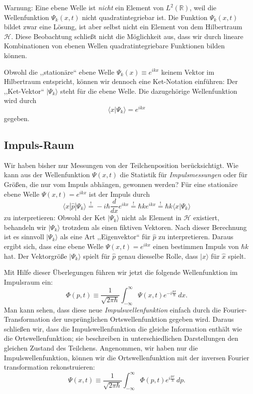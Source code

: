 Warnung: Eine ebene Welle ist \emph{nicht} ein Element von $L^2(\mathbb{R})$, weil die Wellenfunktion $\Psi_{k}(x,t)$ nicht quadratintegriebar ist. Die Funktion $\Psi_{k}(x,t)$ bildet zwar eine Lösung, ist aber selbst nicht ein Element von dem Hilbertraum $\mathcal{H}$. Diese Beobachtung schließt nicht die Möglichkeit aus, dass wir durch lineare Kombinationen von ebenen Wellen quadratintegriebare Funktionen bilden können.

Obwohl die ,,stationäre`` ebene Welle $\Psi_{k}(x) \equiv e^{ikx}$ keinem Vektor im Hilbertraum entspricht,  können wir dennoch eine Ket-Notation einführen: Der ,,Ket-Vektor`` $|\Psi_{k}\rangle$ steht für die ebene Welle. Die dazugehörige Wellenfunktion wird durch
\begin{equation}
	\langle x| \Psi_{k}\rangle = e^{ikx}
\end{equation} 
gegeben.


\subsection{Impuls-Raum}
Wir haben bisher nur Messungen von der Teilchenposition berücksichtigt. Wie kann aus der Wellenfunktion $\Psi(x,t)$ die Statistik für \emph{Impulsmessungen} oder für Größen, die nur vom Impuls abhängen, gewonnen werden? Für eine stationäre ebene Welle $\Psi(x,t) = e^{ikx}$ ist der Impuls durch
\begin{equation}
	\langle x|\widehat{p}|\Psi_k\rangle \overset{!}{=}  -i\hbar \frac{d}{dx} e^{ikx}  \overset{!}{=} \hbar k   e^{ikx} \overset{!}{=} \hbar k \langle x|\Psi_k\rangle
\end{equation}
zu interpretieren: Obwohl der Ket $|\Psi_k\rangle$ nicht als Element in $\mathcal{H}$ existiert, behandeln wir $|\Psi_k\rangle$ trotzdem als einen fiktiven Vektoren. Nach dieser Berechnung ist es sinnvoll $|\Psi_k\rangle$ als eine Art ,,Eigenvektor`` für $\widehat{p}$ zu interpretieren. Daraus ergibt sich, dass eine ebene Welle $\Psi(x,t) = e^{ikx}$ einen bestimmen Impuls von $\hbar k$ hat. Der Vektorgröße $|\Psi_k\rangle$ spielt für $\widehat{p}$ genau diesselbe Rolle, dass $|x\rangle$ für $\widehat{x}$ spielt.

Mit Hilfe dieser Überlegungen führen wir jetzt die folgende Wellenfunktion im Impulsraum ein:
\begin{equation}
	\Phi(p,t) \equiv \frac{1}{\sqrt{2\pi\hbar}} \int_{-\infty}^\infty \Psi(x,t)e^{-i\frac{px}{\hbar}}\,dx.	
\end{equation} 
Man kann sehen, dass diese neue \emph{Impulswellenfunktion} einfach durch die Fourier-Transformation der ursprünglichen Ortswellenfunktion gegeben wird. Daraus schließen wir, dass die Impulswellenfunktion die gleiche Information enthält wie die Ortswellenfunktion; sie beschreiben in unterschiedlichen Darstellungen den gleichen Zustand des Teilchens. Angenommen, wir haben nur die Impulswellenfunktion, können wir die Ortswellenfunktion  mit der inversen Fourier transformation rekonstruieren:
\begin{equation}
	\Psi(x,t) \equiv \frac{1}{\sqrt{2\pi\hbar}} \int_{-\infty}^\infty \Phi(p,t)e^{i\frac{px}{\hbar}}\,dp.	
\end{equation} 

